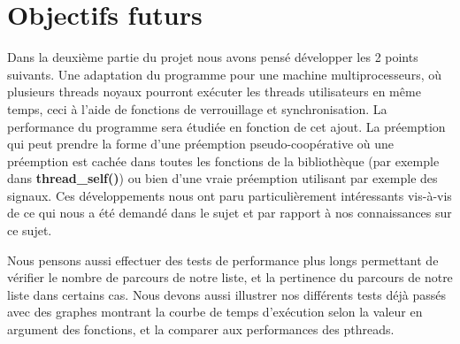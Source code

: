 \documentclass{article}
\begin{document}
\section{Objectifs futurs}
Dans la deuxième partie du projet nous avons pensé développer les 2 points
suivants.
Une adaptation du programme pour une machine multiprocesseurs, où plusieurs
threads noyaux pourront exécuter les threads utilisateurs en même temps, ceci à
l’aide de fonctions de verrouillage et synchronisation.
La performance du programme sera étudiée en fonction de cet ajout.
La préemption qui peut prendre la forme d’une préemption pseudo-coopérative où
une préemption est cachée dans toutes les fonctions de la bibliothèque (par
exemple dans \textbf{thread\_self()}) ou bien d’une vraie préemption utilisant
par exemple des signaux.
Ces développements nous ont paru particulièrement intéressants vis-à-vis de ce
qui nous a été demandé dans le sujet et par rapport à nos connaissances sur ce
sujet.

Nous pensons aussi effectuer des tests de performance plus longs permettant de
vérifier le nombre de parcours de notre liste, et la pertinence du parcours de
notre liste dans certains cas.
Nous devons aussi illustrer nos différents tests déjà passés avec des graphes
montrant la courbe de temps d'exécution selon la valeur en argument des
fonctions, et la comparer aux performances des pthreads.
\end{document}
